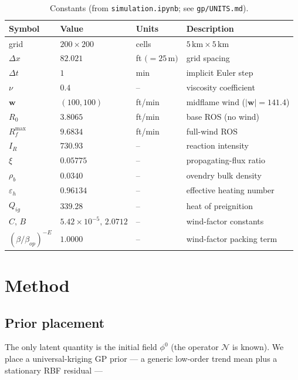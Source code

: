 \documentclass[11pt]{article}
\newcommand{\bw}{\mathbf{w}}
\newcommand{\N}{\mathcal{N}}
\begin{document}
\begin{table}[h]
  \centering
  \caption{Constants (from \texttt{simulation.ipynb}; see \texttt{gp/UNITS.md}).}
  \label{tab:constants}
  \begin{tabular}{@{}llll@{}}
    \toprule
    Symbol & Value & Units & Description \\
    \midrule
    grid & $200\times200$ & cells & $5\,\mathrm{km}\times5\,\mathrm{km}$ \\
    $\Delta x$ & $82.021$ & ft $(=25$\,m$)$ & grid spacing \\
    $\Delta t$ & $1$ & min & implicit Euler step \\
    $\nu$ & $0.4$ & -- & viscosity coefficient \\
    $\bw$ & $(100,100)$ & ft/min & midflame wind ($|\bw|=141.4$) \\
    $R_0$ & $3.8065$ & ft/min & base ROS (no wind) \\
    $R_f^{\max}$ & $9.6834$ & ft/min & full-wind ROS \\
    $I_R$ & $730.93$ & -- & reaction intensity \\
    $\xi$ & $0.05775$ & -- & propagating-flux ratio \\
    $\rho_b$ & $0.0340$ & -- & ovendry bulk density \\
    $\varepsilon_h$ & $0.96134$ & -- & effective heating number \\
    $Q_{ig}$ & $339.28$ & -- & heat of preignition \\
    $C,\,B$ & $5.42\!\times\!10^{-5},\,2.0712$ & -- & wind-factor constants \\
    $(\beta/\beta_{op})^{-E}$ & $1.0000$ & -- & wind-factor packing term \\
    \bottomrule
  \end{tabular}
\end{table}

\section{Method}

\subsection{Prior placement}

The only latent quantity is the initial field $\phi^{0}$ (the operator $\N$ is
known). We place a universal-kriging GP prior --- a generic low-order trend mean
plus a stationary RBF residual ---
\end{document}
